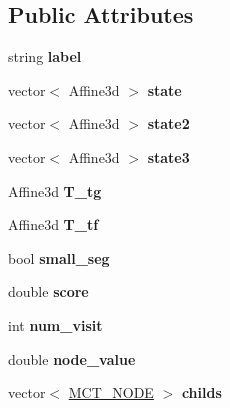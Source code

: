 \subsection*{Public Attributes}
\begin{DoxyCompactItemize}
\item 
\mbox{\label{classMCT__NODE_aed103b475b9ac51892f89c87463b8757}} 
string {\bfseries label}
\item 
\mbox{\label{classMCT__NODE_ad5ec5cb688cefdd41776daad0e05a1e2}} 
vector$<$ Affine3d $>$ {\bfseries state}
\item 
\mbox{\label{classMCT__NODE_ac29a76b4d3b54f40260a6d151153f32d}} 
vector$<$ Affine3d $>$ {\bfseries state2}
\item 
\mbox{\label{classMCT__NODE_a8081b0320ef5642b231a432a06520181}} 
vector$<$ Affine3d $>$ {\bfseries state3}
\item 
\mbox{\label{classMCT__NODE_ac550ba83323e4d415ff6b6c99608439f}} 
Affine3d {\bfseries T\+\_\+tg}
\item 
\mbox{\label{classMCT__NODE_a143531d5ca4a83852a3ba519cd390eeb}} 
Affine3d {\bfseries T\+\_\+tf}
\item 
\mbox{\label{classMCT__NODE_a364f2844d094010f5a3397db4b8e8849}} 
bool {\bfseries small\+\_\+seg}
\item 
\mbox{\label{classMCT__NODE_ae26c68e4e22b627657a5704a4e6e434f}} 
double {\bfseries score}
\item 
\mbox{\label{classMCT__NODE_a32f880a1f3a84b2f890b70178a15ec3b}} 
int {\bfseries num\+\_\+visit}
\item 
\mbox{\label{classMCT__NODE_ac0493080d5fb0ad63946e8762d397db5}} 
double {\bfseries node\+\_\+value}
\item 
\mbox{\label{classMCT__NODE_a89fecc3481363e9bea16776eb88c8b40}} 
vector$<$ \hyperlink{classMCT__NODE}{M\+C\+T\+\_\+\+N\+O\+DE} $>$ {\bfseries childs}
\item 

\end{DoxyCompactItemize}
